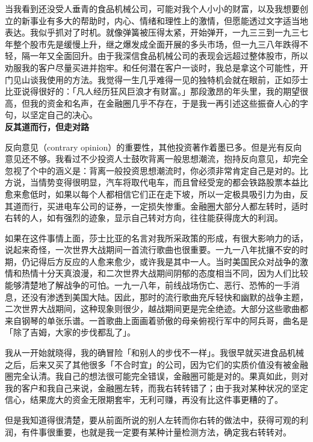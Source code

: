\documentclass[UTF8,a4paper,zihao=-4,fontset = windows]{ctexart} %
\begin{document}
当我看到还没受人垂青的食品机械公司，可能对我个人小小的财富，以及我想要创立的新事业有多大的帮助时，内心、情绪和理性上的激情，但愿能透过文字适当地表达。我似乎抓对了时机。就像弹簧被压得太紧，开始弹开，一九三三到一九三七年整个股市先是缓慢上升，继之爆发成全面开展的多头市场，但一九三八年跌得不轻，隔一年又全面回升。由于我深信食品机械公司的表现会远超过整体股市，所以劝服我的客户尽量买进并抱牢。和任何潜在客户一谈时，我总是拿这个可能性，开门见山谈我使用的方法。我觉得一生几乎难得一见的独特机会就在眼前，正如莎士比亚说得很好的：「凡人经历狂风巨浪才有财富。」那段激昂的年头里，我的期望很高，但我的资金和名声，在金融圈几乎不存在，于是我一再引述这些振奋人心的字句，以坚定自己的决心。
\\

\textbf{反其道而行，但走对路}


反向意见（contrary opinion）的重要性，其他投资著作着墨已多。但是光有反向意见还不够。我看过不少投资人士鼓吹背离一般思想潮流，抱持反向意见，却完全忽视了个中的涵义是：背离一般投资思想潮流时，你必须非常肯定自己是对的。比方说，当情势变得很明显，汽车将取代电车，而且曾经受宠的都会铁路股票本益比愈来愈低时，如果以每个人都相信它们正在走下坡，所以一定极具吸引力为由，反其道而行，买进电车公司的证券，一定损失惨重。金融圈大部分人都左转时，适时右转的人，如有强烈的迹象，显示自己转对方向，往往能获得庞大的利润。

如果在这件事情上面，莎士比亚的名言对我所采政策的形成，有很大影响力的话，说起来奇怪，一次世界大战期间一首流行歌曲也很重要。一九一八年扰攘不安的时期，仍记得后方反应的人愈来愈少，或许我是其中一人。当时美国民众对战争的激情和热情十分天真浪漫，和二次世界大战期间阴郁的态度相当不同，因为人们比较能够清楚地了解战争的可怕。一九一八年，前线战场伤亡、恶行、恐怖的一手消息，还没有渗透到美国大陆。因此，那时的流行歌曲充斥轻快和幽默的战争主题，二次世界大战期间，这种现象则很少，越战期间更是完全绝迹。大部分这些歌曲都来自钢琴的单张乐谱。一首歌曲上面画着骄傲的母亲俯视行军中的阿兵哥，曲名是「除了吉姆，大家的步伐都乱了」。

我从一开始就晓得，我的确冒险「和别人的步伐不一样」。我很早就买进食品机械之后，后来又买了其他很多「不合时宜」的公司，因为它们的实质价值没有被金融圈完全认清。我自己的想法很可能完全错误，金融圈可能是对的。果真如此，则对我的客户和我自己来说，金融圈左转，而我右转转错了；由于我对某种状况的坚定信心，结果庞大的资金无限期套牢，无利可赚，再没有比这件事更糟的了。

但是我知道得很清楚，要从前面所说的别人左转而你右转的做法中，获得可观的利润，有件事很重要，也就是我一定要有某种计量检测方法，确定我右转转对。
\\
\end{document}
